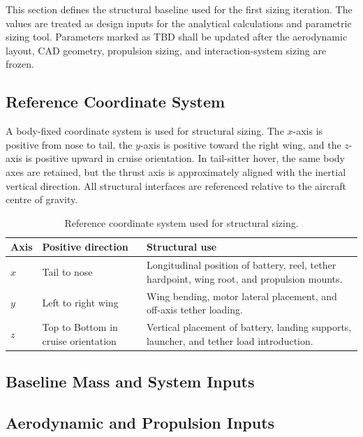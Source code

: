 This section defines the structural baseline used for the first sizing iteration. The values are treated as design inputs for the analytical calculations and parametric sizing tool. Parameters marked as TBD shall be updated after the aerodynamic layout, CAD geometry, propulsion sizing, and interaction-system sizing are frozen.

\subsection{Reference Coordinate System}

A body-fixed coordinate system is used for structural sizing. The \(x\)-axis is positive from nose to tail, the \(y\)-axis is positive toward the right wing, and the \(z\)-axis is positive upward in cruise orientation. In tail-sitter hover, the same body axes are retained, but the thrust axis is approximately aligned with the inertial vertical direction. All structural interfaces are referenced relative to the aircraft centre of gravity.

\begin{table}[H]
\centering
\small
\caption{Reference coordinate system used for structural sizing.}
\label{tab:structural_coordinate_system}
\begin{tabularx}{\textwidth}{@{}p{}p{}X@{}}
\toprule
\textbf{Axis} & \textbf{Positive direction} & \textbf{Structural use} \\
\midrule
\(x\) & Tail to nose & Longitudinal position of battery, reel, tether hardpoint, wing root, and propulsion mounts. \\
\(y\) & Left to right wing & Wing bending, motor lateral placement, and off-axis tether loading. \\
\(z\) & Top  to Bottom in cruise orientation & Vertical placement of battery, landing supports, launcher, and tether load introduction. \\
\bottomrule
\end{tabularx}
\end{table}

\subsection{Baseline Mass and System Inputs}




\subsection{Aerodynamic and Propulsion Inputs}

